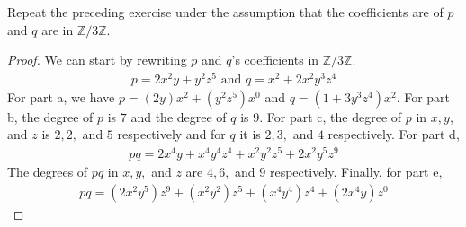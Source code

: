 \documentclass[10pt]{article}
\newenvironment{problem}[2][Problem]{\begin{trivlist}
		\item[\hskip \labelsep {\bfseries #1}\hskip \labelsep {\bfseries #2.}]}{\end{trivlist}}
\begin{document}
	\begin{problem}{1.2}
		Repeat the preceding exercise under the assumption that the coefficients are of $p$ and $q$ are in $\mathbb{Z}/3\mathbb{Z}$.
		\begin{proof}
			We can start by rewriting $p$ and $q$'s coefficients in $\mathbb{Z}/3\mathbb{Z}$.
			\begin{align*}
				p = 2x^2 y + y^2 z^5 \text{ and } q = x^2 + 2x^2 y^3 z^4
			\end{align*}
			For part a, we have $p=(2y)x^2 + (y^2 z^5)x^0$ and $q=(1 + 3y^3 z^4)x^2$. For part b, the degree of $p$ is $7$ and the degree of $q$ is $9$. For part c, the degree of $p$ in $x,y$, and $z$ is $2,2,$ and $5$ respectively and for $q$ it is $2,3,$ and $4$ respectively. For part d,
			\begin{align*}
				pq = 2x^4 y + x^4 y^4 z^4 + x^2 y^2 z^5 + 2x^2 y^5 z^9
			\end{align*}
			The degrees of $pq$ in $x,y,$ and $z$ are $4,6,$ and $9$ respectively. Finally, for part e,
			\begin{align*}
				pq = (2x^2 y^5)z^9 + (x^2 y^2) z^5 + (x^4 y^4)z^4 + (2x^4 y)z^0 
			\end{align*}
		\end{proof}
	\end{problem}
	
\end{document}
